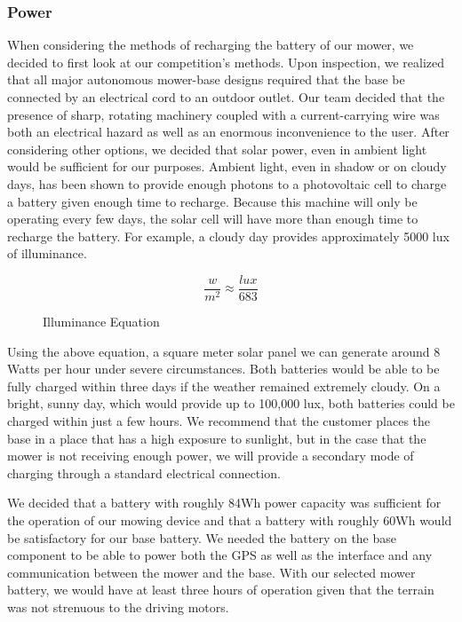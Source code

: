 \documentclass[12pt,letterpaper]{article}
\begin{document}
\subsubsection{Power}
When considering the methods of recharging the battery of our mower, we decided
to first look at our competition's methods. Upon inspection, we realized that
all major autonomous mower-base designs required that the base be connected by
an electrical cord to an outdoor outlet. Our team decided that the presence of
sharp, rotating machinery coupled with a current-carrying wire was both an
electrical hazard as well as an enormous inconvenience to the user. After
considering other options, we decided that solar power, even in ambient light
would be sufficient for our purposes.\autocite{radiometry} Ambient light, even
in shadow or on cloudy days, has been shown to provide enough photons to a
photovoltaic cell to charge a battery given enough time to recharge. Because
this machine will only be operating every few days, the solar cell will have
more than enough time to recharge the battery. For example, a cloudy day
provides approximately 5000 lux of illuminance.
 
\begin{figure}[h!]
\[
	\dfrac{w}{m^2} \approx \dfrac{lux}{683}
\]
\caption{Illuminance Equation}
\end{figure}

Using the above equation, a square meter solar panel we can generate
around 8 Watts per hour under severe circumstances.\autocite{radiation} Both
batteries would be able to be fully charged within three days if the weather remained extremely cloudy. On a bright, sunny day,
which would provide up to 100,000 lux, both batteries could be charged within
just a few hours. We recommend that the customer places the base in a place that
has a high exposure to sunlight, but in the case that the mower is not receiving
enough power, we will provide a secondary mode of charging through a standard
electrical connection.

We decided that a battery with roughly 84Wh power capacity was sufficient for
the operation of our mowing device and that a battery with roughly 60Wh would be
satisfactory for our base battery. We needed the battery on the base component
to be able to power both the GPS as well as the interface and any communication
between the mower and the base. With our selected mower battery, we would have
at least three hours of operation given that the terrain was not strenuous to
the driving motors.
\end{document}
